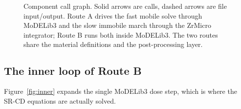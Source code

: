 \documentclass[11pt]{article}
\newcommand{\ZrM}{\textsf{ZrMicro}}
\newcommand{\MoD}{\textsf{MoDELib3}}
\begin{document}
\begin{figure}[htbp]
\caption{Component call graph. Solid arrows are calls, dashed arrows are file
input/output. Route A drives the fast mobile solve through \MoD{} and the slow
immobile march through the \ZrM{} integrator; Route B runs both inside \MoD{}.
The two routes share the material definitions and the post-processing layer.}
\label{fig:flow}
\end{figure}

\clearpage

\subsection{The inner loop of Route B}

Figure~\ref{fig:inner} expands the single \MoD{} dose step, which is where the
SR-CD equations are actually solved.
\end{document}
